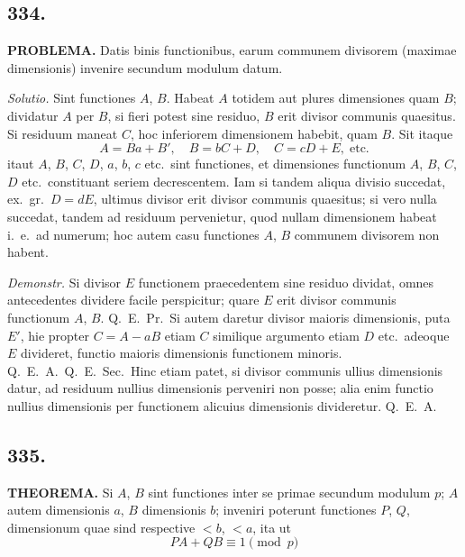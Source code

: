 \documentclass[12pt,a4paper]{article}
\begin{document}
\subsection*{334.}

\textbf{PROBLEMA.} Datis binis functionibus, earum communem divisorem (maximae dimensionis) invenire secundum modulum datum.

\textit{Solutio.} Sint functiones $A$, $B$. Habeat $A$ totidem aut plures dimensiones quam $B$; dividatur $A$ per $B$, si fieri potest sine residuo, $B$ erit divisor communis quaesitus. Si residuum maneat $C$, hoc inferiorem dimensionem habebit, quam $B$. Sit itaque
\[
A = Ba + B',\quad B = bC + D,\quad C = cD + E,\; \text{etc.}
\]
itaut $A$, $B$, $C$, $D$, $a$, $b$, $c$ etc.~sint functiones, et dimensiones functionum $A$, $B$, $C$, $D$ etc.~constituant seriem decrescentem. Iam si tandem aliqua divisio succedat, ex.~gr.~$D=dE$, ultimus divisor erit divisor communis quaesitus; si vero nulla succedat, tandem ad residuum pervenietur, quod nullam dimensionem habeat i.~e.~ad numerum; hoc autem casu functiones $A$, $B$ communem divisorem non habent.

\textit{Demonstr.} Si divisor $E$ functionem praecedentem sine residuo dividat, omnes antecedentes dividere facile perspicitur; quare $E$ erit divisor communis functionum $A$, $B$. Q.~E.~Pr.~Si autem daretur divisor maioris dimensionis, puta $E'$, hie propter $C=A-aB$ etiam $C$ similique argumento etiam $D$ etc.~adeoque $E$ divideret, functio maioris dimensionis functionem minoris. Q.~E.~A.~Q.~E.~Sec.~Hinc etiam patet, si divisor communis ullius dimensionis datur, ad residuum nullius dimensionis perveniri non posse; alia enim functio nullius dimensionis per functionem alicuius dimensionis divideretur. Q.~E.~A.

\subsection*{335.}

\textbf{THEOREMA.} Si $A$, $B$ sint functiones inter se primae secundum modulum $p$; $A$ autem dimensionis $a$, $B$ dimensionis $b$; inveniri poterunt functiones $P$, $Q$, dimensionum quae sind respective $<b$, $<a$, ita ut
\[
PA + QB \equiv 1 \pmod{p}
\]
\end{document}
